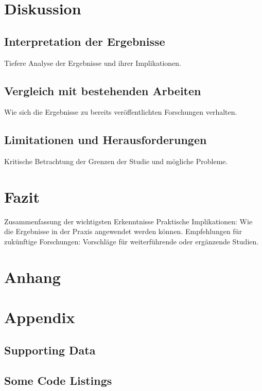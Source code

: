 \documentclass[%
thesis=student,%
coverpage=false,%
titlepage=false,%
headmarks=true, %
german,%
font=libertine, %
math=newpxtx, %
BCOR=5mm,%
coverBCOR=11mm%
]{tumbook}
\theoremstyle{break}
\begin{document}
\chapter{Diskussion}
\section{Interpretation der Ergebnisse}
Tiefere Analyse der Ergebnisse und ihrer Implikationen.
\section{Vergleich mit bestehenden Arbeiten}
Wie sich die Ergebnisse zu bereits veröffentlichten Forschungen verhalten.
\section{Limitationen und Herausforderungen}
Kritische Betrachtung der Grenzen der Studie und mögliche Probleme.
\chapter{Fazit}
Zusammenfassung der wichtigsten Erkenntnisse
Praktische Implikationen: Wie die Ergebnisse in der Praxis angewendet werden können.
Empfehlungen für zukünftige Forschungen: Vorschläge für weiterführende oder ergänzende Studien.
\chapter{Anhang}
\appendix
\chapter{Appendix}
\section{Supporting Data}
\section{Some Code Listings}

\backmatter{}
\listoffigures%
\listoftables%

\nocite{Alspach:2008,GaleShapley:1962} %
\printbibliography{} %
\end{document}
